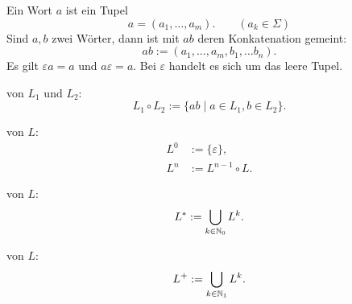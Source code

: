 \noindent
Ein Wort $a$ ist ein Tupel
\begin{equation}
a = (a_1,\ldots, a_m).\qquad (a_k\in\Sigma)
\end{equation}
Sind $a,b$ zwei Wörter, dann ist mit $ab$ deren Konkatenation
gemeint:
\begin{equation}
ab := (a_1,\ldots,a_m,b_1,\ldots b_n).
\end{equation}
Es gilt $\varepsilon a=a$ und $a\varepsilon=a$.
Bei $\varepsilon$ handelt es sich um das leere Tupel.

\begin{definition}
 von $L_1$ und $L_2$:
\begin{equation}
L_1\circ L_2 := \{ab\mid a\in L_1, b\in L_2\}.
\end{equation}
\end{definition}

\begin{definition}
 von $L$:
\begin{align}
L^0 &:= \{\varepsilon\},\\
L^n &:= L^{n-1}\circ L.
\end{align}
\end{definition}

\begin{definition}
 von $L$:
\begin{equation}
L^* := \bigcup_{k\in\mathbb N_0} L^k.
\end{equation}

 von $L$:
\begin{equation}
L^+ := \bigcup_{k\in\mathbb N_1} L^k.
\end{equation}
\end{definition}


